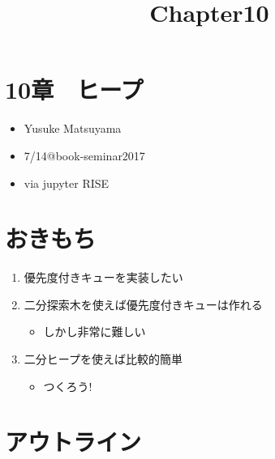 \documentclass[11pt]{article}
\title{Chapter10}
\providecommand{\tightlist}{%
      \setlength{\itemsep}{0pt}\setlength{\parskip}{0pt}}
\begin{document}
    
    
    \maketitle
    
    

    
    \section{10章　ヒープ}\label{ux7ae0ux30d2ux30fcux30d7}

\begin{itemize}
\tightlist
\item
  Yusuke Matsuyama
\item
  7/14@book-seminar2017
\item
  via jupyter RISE
\end{itemize}

    \section{おきもち}\label{ux304aux304dux3082ux3061}

\begin{enumerate}
\def\labelenumi{\arabic{enumi}.}
\tightlist
\item
  優先度付きキューを実装したい
\item
  二分探索木を使えば優先度付きキューは作れる

  \begin{itemize}
  \tightlist
  \item
    しかし非常に難しい
  \end{itemize}
\item
  二分ヒープを使えば比較的簡単

  \begin{itemize}
  \tightlist
  \item
    つくろう!
  \end{itemize}
\end{enumerate}

    \section{アウトライン}\label{ux30a2ux30a6ux30c8ux30e9ux30a4ux30f3}
\end{document}
